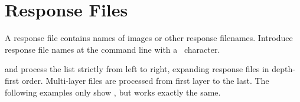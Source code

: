 

\section[Response Files\commonpart]{Response Files\commonpart
  \label{sec:response-files}
  }

A response file contains names of images or other response filenames.
Introduce response file names at the command line with a
~character.%
%
       {}

 and  process%
%
the list  strictly from left to right, expanding
response files in depth-first order.  Multi-layer files are processed
from first layer to the last.  The following examples only show
, but  works exactly the
same.

